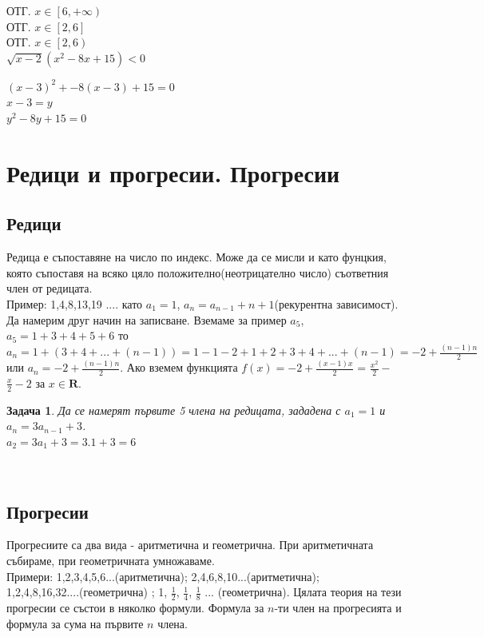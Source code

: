 \documentclass{article}
\newtheorem{problem}{Задача}
\begin{document}
ОТГ. $ x \in \left[ 6, + \infty \right) $ \\
ОТГ. $ x \in \left[ 2, 6 \right] $ \\
ОТГ. $ x \in \left[ 2 , 6 \right) $ \\ 


$ \sqrt{x-2}(x^2 - 8x + 15) < 0 $


$(x-3)^2 + -8(x-3) + 15 = 0 $ \\
$x-3 = y $ \\
$y^2 - 8y + 15 = 0 $



\section{Редици и прогресии. Прогресии}

\subsection{Редици}
Редица е съпоставяне на число по индекс. Може да се мисли и като фунцкия, която съпоставя на всяко цяло положително(неотрицателно число) съответния член от редицата.  \\
Пример: 1,4,8,13,19 .... като $a_1 = 1$, $a_n = a_{n-1} + n+1 $(рекурентна зависимост). Да намерим друг начин на записване. Вземаме за пример $a_5$, 
$a_5 = 1 + 3 + 4 + 5 + 6  $  то $a_n = 1 + (3 + 4 + ...+(n-1)) = 1-1-2+1+2+3+4+...+(n-1) = -2 + \frac{(n-1)n}{2}$  или $a_n = -2 + \frac{(n-1)n}{2} $. Ако вземем функцията $f(x) = -2 + \frac{(x-1)x}{2}$ = $\frac{x^2}{2} - $$\frac{x}{2}-2$ за  $x \in \mathbf{R} $.


\begin{problem} Да се намерят първите 5 члена на редицата, зададена с
	$a_1 = 1 $ и	$a_n = 3a_{n-1} + 3 $. \\
	
	
	  $a_2 = 3a_1 + 3 = 3.1 + 3 = 6 $
	  
	  
\end{problem}
$ $


\subsection{Прогресии}

Прогресиите са два вида - аритметична и геометрична. При аритметичната събираме, при геометричната умножаваме. \\
Примери: 1,2,3,4,5,6...(аритметична); 2,4,6,8,10...(аритметична); \\ 1,2,4,8,16,32....(геометрична) ; 1, $\frac{1}{2}$, $\frac{1}{4}$, $\frac{1}{8}$ ... (геометрична).
Цялата теория на тези прогресии се състои в няколко формули. Формула за $n$-ти член на прогресията и формула за сума на първите $n$ члена.
\end{document}
